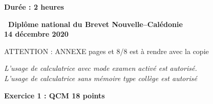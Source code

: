 \documentclass[10pt]{article}
\begin{document}
\setlength\parindent{0mm}
\pagestyle{fancy}
\thispagestyle{empty}

\begin{center}\textbf{Durée : 2 heures}

\vspace{0,5cm}

{\Large\textbf{\decofourleft~Diplôme national du Brevet
Nouvelle--Calédonie~\decofourright}}\\[5pt]
{\Large \textbf{14 décembre 2020}}

\medskip

ATTENTION : ANNEXE pages  et 8/8 est à rendre avec la copie

\medskip

\emph{L'usage de calculatrice avec mode examen activé est autorisé.\\
L'usage de calculatrice sans mémoire \og type collège \fg{} est autorisé}

\end{center}

\vspace{0,5cm}

\textbf{Exercice 1 : QCM \hfill 18 points}

\medskip
\end{document}
